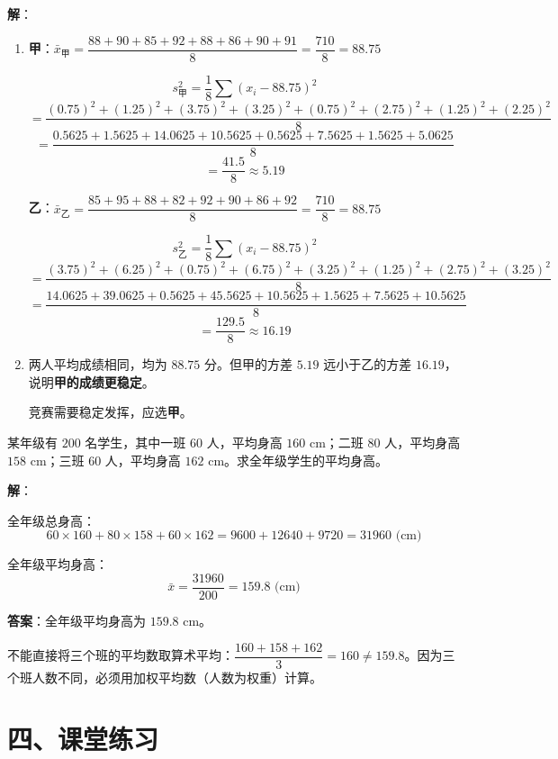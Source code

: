\documentclass[12pt, a4paper]{ctexart}
\begin{document}
\textbf{解}：

\begin{enumerate}[leftmargin=2em]
  \item \textbf{甲}：$\bar{x}_{\text{甲}} = \dfrac{88+90+85+92+88+86+90+91}{8} = \dfrac{710}{8} = 88.75$

  $$s^2_{\text{甲}} = \frac{1}{8}\sum(x_i - 88.75)^2$$
  $$= \frac{(0.75)^2+(1.25)^2+(3.75)^2+(3.25)^2+(0.75)^2+(2.75)^2+(1.25)^2+(2.25)^2}{8}$$
  $$= \frac{0.5625+1.5625+14.0625+10.5625+0.5625+7.5625+1.5625+5.0625}{8}$$
  $$= \frac{41.5}{8} \approx 5.19$$

  \textbf{乙}：$\bar{x}_{\text{乙}} = \dfrac{85+95+88+82+92+90+86+92}{8} = \dfrac{710}{8} = 88.75$

  $$s^2_{\text{乙}} = \frac{1}{8}\sum(x_i - 88.75)^2$$
  $$= \frac{(3.75)^2+(6.25)^2+(0.75)^2+(6.75)^2+(3.25)^2+(1.25)^2+(2.75)^2+(3.25)^2}{8}$$
  $$= \frac{14.0625+39.0625+0.5625+45.5625+10.5625+1.5625+7.5625+10.5625}{8}$$
  $$= \frac{129.5}{8} \approx 16.19$$

  \item 两人平均成绩相同，均为 $88.75$ 分。但甲的方差 $5.19$ 远小于乙的方差 $16.19$，说明\textbf{甲的成绩更稳定}。

  竞赛需要稳定发挥，应选\textbf{甲}。
\end{enumerate}

\begin{appbox}
某年级有 $200$ 名学生，其中一班 $60$ 人，平均身高 $160$ cm；二班 $80$ 人，平均身高 $158$ cm；三班 $60$ 人，平均身高 $162$ cm。求全年级学生的平均身高。
\end{appbox}

\textbf{解}：

全年级总身高：
$$60 \times 160 + 80 \times 158 + 60 \times 162 = 9600 + 12640 + 9720 = 31960 \text{ (cm)}$$

全年级平均身高：
$$\bar{x} = \frac{31960}{200} = 159.8 \text{ (cm)}$$

\textbf{答案}：全年级平均身高为 $159.8$ cm。

\begin{warnbox}[易错提醒]
不能直接将三个班的平均数取算术平均：$\dfrac{160+158+162}{3} = 160 \neq 159.8$。因为三个班人数不同，必须用加权平均数（人数为权重）计算。
\end{warnbox}

\section*{\textcolor{tipgreen}{四、课堂练习}}
\end{document}
